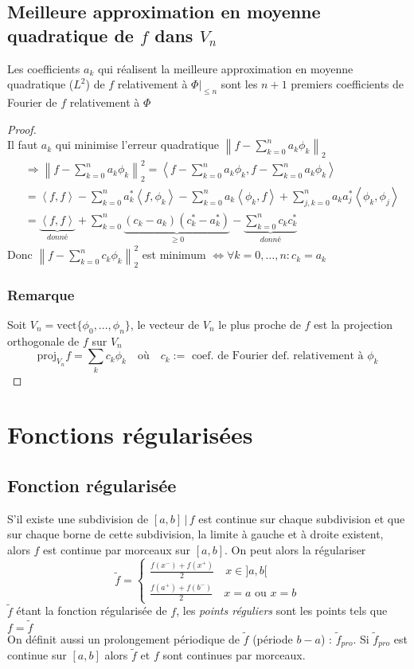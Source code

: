 \documentclass[11pt, a4paper, openany]{book}
\begin{document}
		\subsection{Meilleure approximation en moyenne quadratique de $f$ dans $V_n$}
		Les coefficients $a_k$ qui réalisent la meilleure approximation en moyenne quadratique ($L^2$) de $f$ relativement à $\Phi|_{\leq n}$ sont les $n+1$ premiers coefficients de Fourier de $f$ relativement à $\Phi$
		\begin{proof}\ \\
			Il faut $a_k$ qui minimise l'erreur quadratique $\left\|f-\sum_{k=0}^na_k\phi_k\right\|_2$ \begin{align*}
			& \Rightarrow \left\|f-\sum_{k=0}^na_k\phi_k\right\|_2^2=\left<f-\sum_{k=0}^na_k\phi_k,f-\sum_{k=0}^na_k\phi_k\right>\\
			& =\left<f,f\right> - \sum_{k=0}^na_k^*\left<f,\phi_k\right>- \sum_{k=0}^na_k\left<\phi_k,f\right> + \sum_{j,k=0}^na_ka_j^*\left<\phi_k,\phi_j\right>\\
			& = \underbrace{\left<f,f\right>}_{donné}+\sum_{k=0}^n\underbrace{(c_k-a_k)(c_k^*-a_k^*)}_{\geq 0}-\underbrace{\sum_{k=0}^nc_kc_k^*}_{donné}
			\end{align*}
			Donc $\left\|f-\sum_{k=0}^nc_k\phi_k\right\|_2^2$ est minimum $\Leftrightarrow \forall k=0,\dots,n : c_k=a_k$
			\subsubsection{Remarque}
			Soit $V_n=\text{vect}\{\phi_0,\dots,\phi_n\}$, le vecteur de $V_n$ le plus proche de $f$ est la projection orthogonale de $f$ sur $V_n$ $$\text{proj}_{V_n}f=\sum_kc_k\phi_k\quad\text{où}\quad c_k:=\text{ coef. de Fourier def. relativement à }\phi_k$$
		\end{proof}
		\section{Fonctions régularisées}
		\subsection{Fonction régularisée}
		S'il existe une subdivision de $[a,b]\,|\,f$ est continue sur chaque subdivision et que sur chaque borne de cette subdivision, la limite à gauche et à droite existent, alors $f$ est continue par morceaux sur $[a,b]$. On peut alors la régulariser $$\tilde{f}=\left\{\begin{array}{l}
		\frac{f(x^-)+f(x^+)}{2}\quad x\in ]a,b[\\
		\frac{f(a^+)+f(b^-)}{2}\quad x=a\text{ ou }x=b
		\end{array}\right.$$ $\tilde{f}$ étant la fonction régularisée de $f$, les \textit{points réguliers} sont les points tels que $f=\tilde{f}$\\ On définit aussi un prolongement périodique de $\tilde{f}$ (période $b-a$) : $\tilde{f}_{pro}$. Si $\tilde{f}_{pro}$ est continue sur $[a,b]$ alors $\tilde{f}$ et $f$ sont continues par morceaux.
\end{document}
